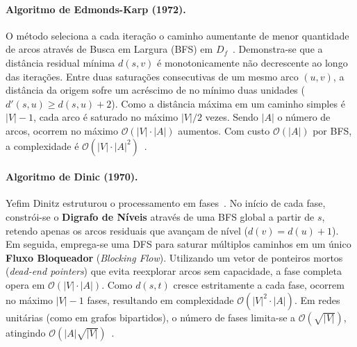 \documentclass[12pt,a4paper]{article}
\begin{document}
\paragraph{Algoritmo de Edmonds-Karp (1972).} O método seleciona a cada iteração o caminho aumentante de menor quantidade de arcos através de Busca em Largura (BFS) em $D_f$~\cite{edmonds1972theoretical}. Demonstra-se que a distância residual mínima $d(s, v)$ é monotonicamente não decrescente ao longo das iterações. Entre duas saturações consecutivas de um mesmo arco $(u, v)$, a distância da origem sofre um acréscimo de no mínimo duas unidades ($d'(s, u) \ge d(s, u) + 2$). Como a distância máxima em um caminho simples é $|V|-1$, cada arco é saturado no máximo $|V|/2$ vezes. Sendo $|A|$ o número de arcos, ocorrem no máximo $\mathcal{O}(|V| \cdot |A|)$ aumentos. Com custo $\mathcal{O}(|A|)$ por BFS, a complexidade é $\mathcal{O}(|V| \cdot |A|^2)$~\cite{korte2018combinatorial}.

\paragraph{Algoritmo de Dinic (1970).} Yefim Dinitz estruturou o processamento em fases~\cite{dinic1970algorithm}. No início de cada fase, constrói-se o \textbf{Digrafo de Níveis} através de uma BFS global a partir de $s$, retendo apenas os arcos residuais que avançam de nível ($d(v) = d(u) + 1$). Em seguida, emprega-se uma DFS para saturar múltiplos caminhos em um único \textbf{Fluxo Bloqueador} (\textit{Blocking Flow}). Utilizando um vetor de ponteiros mortos (\textit{dead-end pointers}) que evita reexplorar arcos sem capacidade, a fase completa opera em $\mathcal{O}(|V| \cdot |A|)$. Como $d(s, t)$ cresce estritamente a cada fase, ocorrem no máximo $|V|-1$ fases, resultando em complexidade $\mathcal{O}(|V|^2 \cdot |A|)$. Em redes unitárias (como em grafos bipartidos), o número de fases limita-se a $\mathcal{O}(\sqrt{|V|})$, atingindo $\mathcal{O}(|A|\sqrt{|V|})$~\cite{ahuja1993network}.
\end{document}

